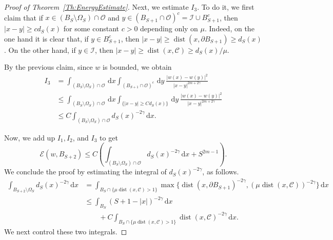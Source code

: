 \documentclass[12pt,reqno]{amsart}
\theoremstyle{definition}
\theoremstyle{remark}
\newcommand{\ccal}{\mathscr{C}}
\newcommand{\ecal}{\mathcal{E}}
\newcommand{\ical}{\mathcal{I}}
\newcommand{\ocal}{\mathcal{O}}
\newcommand{\s}{\gamma}
\renewcommand{\d}{\,\mathrm{d}} %
\DeclareMathOperator{\dist}{dist}
\numberwithin{equation}{section}
\begin{document}
\begin{proof}[Proof of Theorem~\ref{Th:EnergyEstimate}]
	Next, we estimate $I_3$. To do it, we first claim that if $x\in (B_S\setminus \Omega_S) \cap \ocal$ and $y\in (B_{S+1}\cap \ocal)^c = \ical \cup B_{S+1}^c$, then $|x-y|\geq c d_S(x)$ for some constant $c>0$ depending only on $\mu$. Indeed, on the one hand it is clear that, if $y\in B_{S+1}^c$, then $|x-y|\geq \dist(x,\partial B_{S+1})\geq d_S(x)$. On the other hand, if $y\in \ical$, then $|x-y|\geq \dist(x,\ccal) \geq  d_S(x) / \mu$.
	
	By the previous claim, since $w$ is bounded, we obtain
	\begin{align*}
	I_3 &= \int_{(B_S\setminus \Omega_S)\cap \ocal} \d x \int_{(B_{S+1}\cap \ocal)^c} \d y \  \frac{|w(x)-w(y)|^2}{|x-y|^{2m+2\s}} \\
	&\leq \int_{(B_S\setminus \Omega_S)\cap \ocal} \d x \int_{\{|x-y|\geq C d_S(x)\}} \d y \ \frac{|w(x)-w(y)|^2}{|x-y|^{2m+2\s}} \\
	&\leq C \int_{(B_S\setminus \Omega_S)\cap \ocal}  d_S(x)^{-2\s} \d x .
	\end{align*}
	
	Now, we add up $I_1, I_2$, and $I_3$ to get
	\begin{equation}
	\label{Eq:EnergyEstimateProofLastEstimate}
	\ecal(w,B_{S+2}) \leq C \left( \int_{(B_S\setminus \Omega_S)\cap \ocal}  d_S(x)^{-2\s} \d x + S^{2m-1}\right).
	\end{equation}
	We conclude the proof by estimating the integral of $d_S(x)^{-2\s}$, as follows.
	\begin{equation}
	\label{Eq:EnergyEstimatedS}
	\begin{split}
	\int_{B_{S+2}\setminus \Omega_S} d_S(x)^{-2\s} \d x &= \int_{B_{S}\cap \{\mu \dist(x,\ccal)>1\}} \!\!\!\! \max\{\dist(x,\partial B_{S+1})^{-2\s}, (\mu\dist(x,\ccal))^{-2\s}\} \d x \\
	& \leq \int_{B_S} \left( S+1-|x| \right)^{-2\s} \d x \\
	& \quad \quad + C \int_{B_{S}\cap \{\mu \dist(x,\ccal)>1\}} \dist(x,\ccal)^{-2\s} \d x.
	\end{split}
		\end{equation}
	We next control these two integrals.
	

\end{proof}
\end{document}
